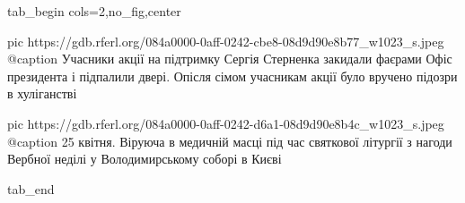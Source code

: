  
 
 
 
 


\ifcmt
  tab_begin cols=2,no_fig,center

     pic https://gdb.rferl.org/084a0000-0aff-0242-cbe8-08d9d90e8b77_w1023_s.jpeg
		 @caption Учасники акції на підтримку Сергія Стерненка закидали фаєрами Офіс президента і підпалили двері. Опісля сімом учасникам акції було вручено підозри в хуліганстві

		 pic https://gdb.rferl.org/084a0000-0aff-0242-d6a1-08d9d90e8b4c_w1023_s.jpeg
		 @caption 25 квітня. Віруюча в медичній масці під час святкової літургії з нагоди Вербної неділі у Володимирському соборі в Києві 

  tab_end
\fi
